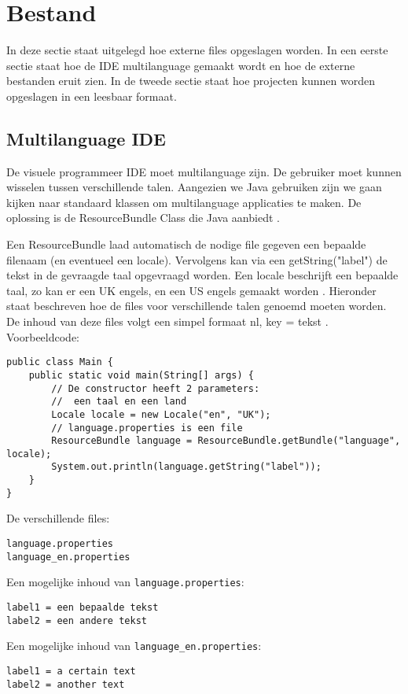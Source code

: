 \documentclass[]{article}
\begin{document}
\section{Bestand}
In deze sectie staat uitgelegd hoe externe files opgeslagen worden. In een eerste sectie staat hoe de IDE multilanguage gemaakt wordt en hoe de externe bestanden eruit zien. In de tweede sectie staat hoe projecten kunnen worden opgeslagen in een leesbaar formaat.
\subsection{Multilanguage IDE}
\label{Multilanguage}
De visuele programmeer IDE moet multilanguage zijn. De gebruiker moet kunnen wisselen tussen verschillende talen. Aangezien we Java gebruiken zijn we gaan kijken naar standaard klassen om multilanguage applicaties te maken. De oplossing is de ResourceBundle Class die Java aanbiedt \cite{javabundle}.

Een ResourceBundle laad automatisch de nodige file gegeven een bepaalde filenaam (en eventueel een locale). Vervolgens kan via een getString("label") de tekst in de gevraagde taal opgevraagd worden. Een locale beschrijft een bepaalde taal, zo kan er een UK engels, en een US engels gemaakt worden \cite{javalocale}. Hieronder staat beschreven hoe de files voor verschillende talen genoemd moeten worden. De inhoud van deze files volgt een simpel formaat nl, key = tekst \cite{jenkov}.\\
Voorbeeldcode: \cite{jenkov}
\lstset{language=Java}
\begin{lstlisting}
public class Main {
	public static void main(String[] args) {
		// De constructor heeft 2 parameters:
		//	een taal en een land
		Locale locale = new Locale("en", "UK"); 
		// language.properties is een file
		ResourceBundle language = ResourceBundle.getBundle("language", locale);
		System.out.println(language.getString("label"));
	}
}
\end{lstlisting}
De verschillende files:
\lstset{language=XML}
\begin{lstlisting}
language.properties
language_en.properties
\end{lstlisting}
Een mogelijke inhoud van \texttt{language.properties}: 
\lstset{language=XML}
\begin{lstlisting}
label1 = een bepaalde tekst
label2 = een andere tekst
\end{lstlisting}
Een mogelijke inhoud van \texttt{language\_en.properties}: 
\lstset{language=XML}
\begin{lstlisting}
label1 = a certain text
label2 = another text
\end{lstlisting}
\end{document}
